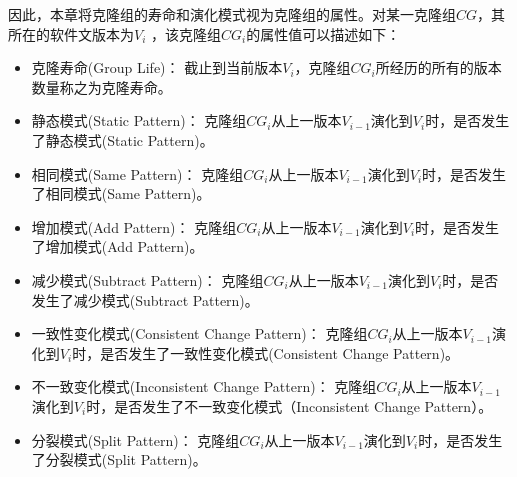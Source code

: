 因此，本章将克隆组的寿命和演化模式视为克隆组的属性。对某一克隆组$CG$，其所在的软件文版本为$V_i $ ，该克隆组{$CG_i$}的属性值可以描述如下：
\begin{itemize}
\item
克隆寿命(Group Life)：
截止到当前版本$V_ i $，克隆组$CG_i$所经历的所有的版本数量称之为克隆寿命。
\item
静态模式(Static Pattern)：
克隆组$CG_i$从上一版本$V_{i-1} $演化到$V_i $时，是否发生了静态模式(Static Pattern)。
\item
相同模式(Same Pattern)：
克隆组$CG_i$从上一版本$V_{i-1} $演化到$V_i $时，是否发生了相同模式(Same Pattern)。
\item
增加模式(Add Pattern)：
克隆组$CG_i$从上一版本$V_{i-1} $演化到$V_i $时，是否发生了增加模式(Add Pattern)。
\item
减少模式(Subtract Pattern)：
克隆组$CG_i$从上一版本$V_{i-1} $演化到$V_i $时，是否发生了减少模式(Subtract Pattern)。
\item
一致性变化模式(Consistent Change Pattern)：
克隆组$CG_i$从上一版本$V_{i-1} $演化到$V_i $时，是否发生了一致性变化模式(Consistent Change Pattern)。
\item
不一致变化模式(Inconsistent Change Pattern)：
克隆组$CG_i$从上一版本$V_{i-1} $演化到$V_ i $时，是否发生了不一致变化模式（Inconsistent Change Pattern）。
\item
分裂模式(Split Pattern)：
克隆组$CG_i$从上一版本$V_{i-1} $演化到$V_i $时，是否发生了分裂模式(Split Pattern)。
\end{itemize}

